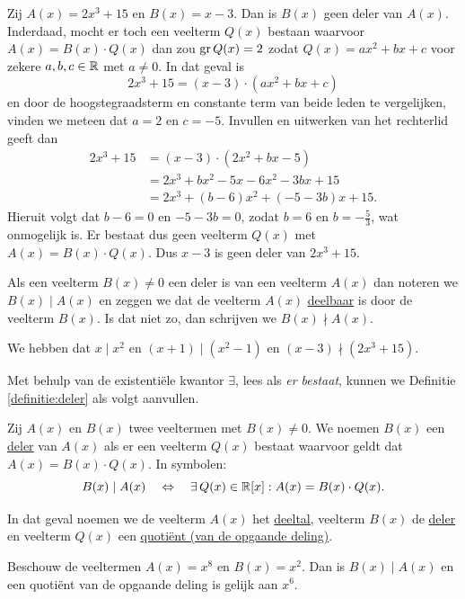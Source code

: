 \documentclass{ximera}
\begin{document}
\begin{example} 
Zij $A(x) = 2x^3+15$ en $B(x) = x-3$. Dan is $B(x)$ geen deler van $A(x)$. Inderdaad, mocht er toch een veelterm $Q(x)$ bestaan waarvoor $A(x) = B(x) \cdot Q(x)$ dan zou $\operatorname{gr} Q(x) = 2$ zodat $Q(x) = a x^2 + b x + c$ voor zekere $a,b,c \in \mathbb{R}$ met $a \neq 0$. In dat geval is
\[
2x^3+15 = (x-3) \cdot (a x^2 + b x + c) 
\]
en door de hoogstegraadsterm en constante term van beide leden te vergelijken, vinden we meteen dat $a = 2$ en $c = -5$. Invullen en uitwerken van het rechterlid geeft dan
\begin{align*}
2x^3+15 
& = (x-3) \cdot (2 x^2 + b x - 5) \\
& = 2x^3 + bx^2 - 5x - 6x^2 - 3bx + 15 \\
& = 2x^3 + (b-6)x^2 + (-5-3b)x + 15.
\end{align*}
Hieruit volgt dat $b - 6 = 0$ en $-5-3b = 0$, zodat $b = 6$ en $b = -\frac{5}{3}$, wat onmogelijk is. Er bestaat dus geen veelterm $Q(x)$ met $A(x) = B(x) \cdot Q(x)$. Dus $x-3$ is geen deler van $2x^3+15$. 
\end{example} 

Als een veelterm $B(x) \neq 0$ een deler is van een veelterm $A(x)$ dan noteren we $B(x) \mid A(x)$ en zeggen we dat de veelterm $A(x)$ \underline{deelbaar} is door de veelterm $B(x)$. Is dat niet zo, dan schrijven we $B(x) \nmid A(x)$. 

\begin{example} 
We hebben dat $x \mid x^2$ en $(x+1) \mid (x^2-1)$ en $(x-3) \nmid (2x^3+15)$.
\end{example} 

Met behulp van de existenti\"ele kwantor $\exists$, lees als {\em er bestaat}, kunnen we Definitie \ref{definitie:deler} als volgt aanvullen.

\begin{definition} 
Zij $A(x)$ en $B(x)$ twee veeltermen met $B(x) \neq 0$. We noemen $B(x)$ een \underline{deler} van $A(x)$ als er een veelterm $Q(x)$ bestaat waarvoor geldt dat $A(x) = B(x)\cdot Q(x)$. In symbolen:
\[
B(x) \mid A(x) \quad \Leftrightarrow \quad \exists \, Q(x) \in \mathbb{R}[x]: A(x) = B(x)\cdot Q(x).
\]
\end{definition} 

In dat geval noemen we de veelterm $A(x)$ het \underline{deeltal}, veelterm $B(x)$ de \underline{deler} en veelterm $Q(x)$ een \underline{quoti\"ent (van de opgaande deling)}. 

\begin{example} 
Beschouw de veeltermen $A(x) = x^8$ en $B(x) = x^2$. Dan is $B(x) \mid A(x)$ en een quoti\"ent van de opgaande deling is gelijk aan $x^6$. 
\end{example} 
\end{document}
